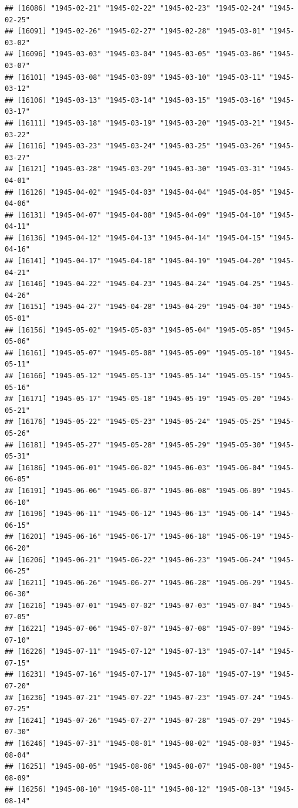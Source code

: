 \documentclass{article}\usepackage[]{graphicx}\usepackage[]{color}
\makeatletter
\newenvironment{kframe}{%
 \def\at@end@of@kframe{}%
 \ifinner\ifhmode%
  \def\at@end@of@kframe{\end{minipage}}%
  \begin{minipage}{\columnwidth}%
 \fi\fi%
 \def\FrameCommand##1{\hskip\@totalleftmargin \hskip-\fboxsep
 \colorbox{shadecolor}{##1}\hskip-\fboxsep
     \hskip-\linewidth \hskip-\@totalleftmargin \hskip\columnwidth}%
 \MakeFramed {\advance\hsize-\width
   \@totalleftmargin\z@ \linewidth\hsize
   \@setminipage}}%
 {\par\unskip\endMakeFramed%
 \at@end@of@kframe}
\newenvironment{knitrout}{}{} %
\makeatother
\begin{document}
\begin{description}
\begin{knitrout}
\begin{kframe}
\begin{verbatim}
## [16086] "1945-02-21" "1945-02-22" "1945-02-23" "1945-02-24" "1945-02-25"
## [16091] "1945-02-26" "1945-02-27" "1945-02-28" "1945-03-01" "1945-03-02"
## [16096] "1945-03-03" "1945-03-04" "1945-03-05" "1945-03-06" "1945-03-07"
## [16101] "1945-03-08" "1945-03-09" "1945-03-10" "1945-03-11" "1945-03-12"
## [16106] "1945-03-13" "1945-03-14" "1945-03-15" "1945-03-16" "1945-03-17"
## [16111] "1945-03-18" "1945-03-19" "1945-03-20" "1945-03-21" "1945-03-22"
## [16116] "1945-03-23" "1945-03-24" "1945-03-25" "1945-03-26" "1945-03-27"
## [16121] "1945-03-28" "1945-03-29" "1945-03-30" "1945-03-31" "1945-04-01"
## [16126] "1945-04-02" "1945-04-03" "1945-04-04" "1945-04-05" "1945-04-06"
## [16131] "1945-04-07" "1945-04-08" "1945-04-09" "1945-04-10" "1945-04-11"
## [16136] "1945-04-12" "1945-04-13" "1945-04-14" "1945-04-15" "1945-04-16"
## [16141] "1945-04-17" "1945-04-18" "1945-04-19" "1945-04-20" "1945-04-21"
## [16146] "1945-04-22" "1945-04-23" "1945-04-24" "1945-04-25" "1945-04-26"
## [16151] "1945-04-27" "1945-04-28" "1945-04-29" "1945-04-30" "1945-05-01"
## [16156] "1945-05-02" "1945-05-03" "1945-05-04" "1945-05-05" "1945-05-06"
## [16161] "1945-05-07" "1945-05-08" "1945-05-09" "1945-05-10" "1945-05-11"
## [16166] "1945-05-12" "1945-05-13" "1945-05-14" "1945-05-15" "1945-05-16"
## [16171] "1945-05-17" "1945-05-18" "1945-05-19" "1945-05-20" "1945-05-21"
## [16176] "1945-05-22" "1945-05-23" "1945-05-24" "1945-05-25" "1945-05-26"
## [16181] "1945-05-27" "1945-05-28" "1945-05-29" "1945-05-30" "1945-05-31"
## [16186] "1945-06-01" "1945-06-02" "1945-06-03" "1945-06-04" "1945-06-05"
## [16191] "1945-06-06" "1945-06-07" "1945-06-08" "1945-06-09" "1945-06-10"
## [16196] "1945-06-11" "1945-06-12" "1945-06-13" "1945-06-14" "1945-06-15"
## [16201] "1945-06-16" "1945-06-17" "1945-06-18" "1945-06-19" "1945-06-20"
## [16206] "1945-06-21" "1945-06-22" "1945-06-23" "1945-06-24" "1945-06-25"
## [16211] "1945-06-26" "1945-06-27" "1945-06-28" "1945-06-29" "1945-06-30"
## [16216] "1945-07-01" "1945-07-02" "1945-07-03" "1945-07-04" "1945-07-05"
## [16221] "1945-07-06" "1945-07-07" "1945-07-08" "1945-07-09" "1945-07-10"
## [16226] "1945-07-11" "1945-07-12" "1945-07-13" "1945-07-14" "1945-07-15"
## [16231] "1945-07-16" "1945-07-17" "1945-07-18" "1945-07-19" "1945-07-20"
## [16236] "1945-07-21" "1945-07-22" "1945-07-23" "1945-07-24" "1945-07-25"
## [16241] "1945-07-26" "1945-07-27" "1945-07-28" "1945-07-29" "1945-07-30"
## [16246] "1945-07-31" "1945-08-01" "1945-08-02" "1945-08-03" "1945-08-04"
## [16251] "1945-08-05" "1945-08-06" "1945-08-07" "1945-08-08" "1945-08-09"
## [16256] "1945-08-10" "1945-08-11" "1945-08-12" "1945-08-13" "1945-08-14"

\end{verbatim}
\end{kframe}
\end{knitrout}
\end{description}
\end{document}
